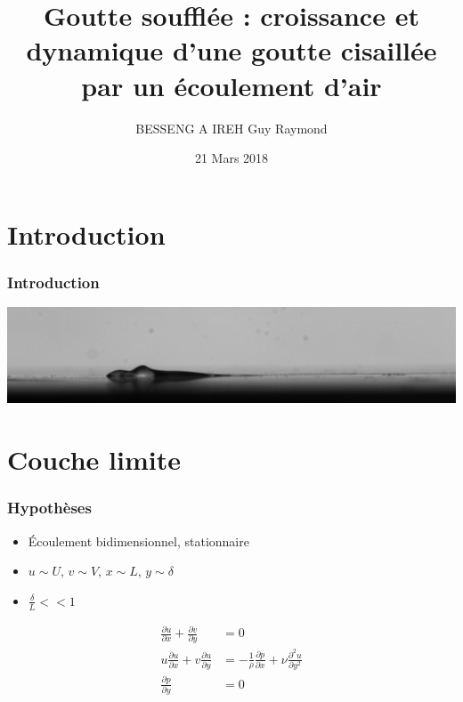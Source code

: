 \documentclass{beamer}
\title{Goutte soufflée : croissance et dynamique d'une goutte cisaillée par un écoulement d'air\xspace}
\author{BESSENG A IREH Guy Raymond}
\institute[]{Université Paul Sabatier}
\date{21 Mars 2018}
\begin{document}
\maketitle
\section{Introduction}\label{sec:introduction}
\begin{frame}
\frametitle{Introduction}
\begin{center}
\includegraphics[height=0.2\linewidth]{./image/test628.jpg} \\ 
\end{center}
\end{frame}


\section{Couche limite}\label{sec:couche}
\begin{frame}
\frametitle{Hypothèses}
\begin{itemize}
\item Écoulement bidimensionnel, stationnaire
\item $u \sim U$, $v \sim V$, $x \sim L$, $y \sim \delta$
\item $\frac{\delta}{L} << 1$
\end{itemize}
\begin{align}	
	\frac{\partial u}{\partial x} 
	+
	\frac{\partial v}{\partial y} 
	&= 0 \\
	u\frac{\partial u}{\partial x} + 
	v\frac{\partial u}{\partial y} 
	&= - \frac{1}{\rho}
	\frac{\partial p}{\partial  x} +
	\nu
	\frac{\partial^{2} u}{\partial  y^{2}} \\
	\frac{\partial p}{\partial y} 
	&= 0
\end{align}
\end{frame}

\end{document}

